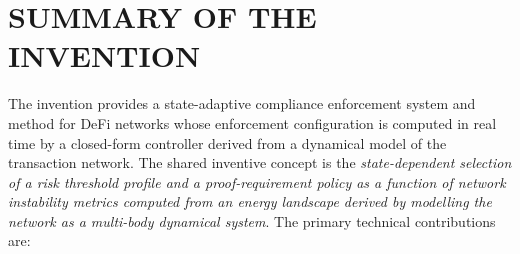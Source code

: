 \documentclass[12pt,a4paper]{article}
\begin{document}
\section{SUMMARY OF THE INVENTION}

The invention provides a state-adaptive compliance enforcement system and
method for DeFi networks whose enforcement configuration is computed in
real time by a closed-form controller derived from a dynamical model of the
transaction network. The shared inventive concept is the
\emph{state-dependent selection of a risk threshold profile and a
proof-requirement policy as a function of network instability metrics
computed from an energy landscape derived by modelling the network as a
multi-body dynamical system}. The primary technical contributions are:
\end{document}
